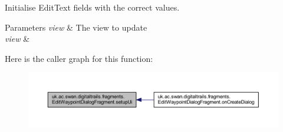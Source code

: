 Initialise Edit\+Text fields with the correct values. 


\begin{DoxyParams}{Parameters}
{\em view} & The view to update \\
\hline
{\em view} & \\
\hline
\end{DoxyParams}


Here is the caller graph for this function\+:\nopagebreak
\begin{figure}[H]
\begin{center}
\leavevmode
\includegraphics[width=350pt]{classuk_1_1ac_1_1swan_1_1digitaltrails_1_1fragments_1_1_edit_waypoint_dialog_fragment_ada4d70217eaebd633c3e15fa620d1512_icgraph}
\end{center}
\end{figure}




